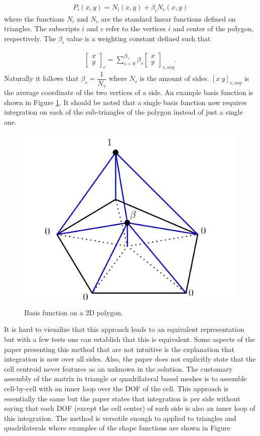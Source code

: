 \documentclass[11pt,letterpaper,titlepage]{article}
\newcommand{\beqn}{\begin{equation}
	\begin{aligned}}
\newcommand{\eeqn}{\end{aligned}
	\end{equation}}
\begin{document}
\beqn 
P_i(x,y) = N_i(x,y) + \beta_i N_c(x,y)
\eeqn 
\newline
where the functions $N_i$ and $N_c$ are the standard linear functions defined on triangles. The subscripts $i$ and $c$ refer to the vertices $i$ and center of the polygon, respectively. The $\beta_i$ value is a weighting constant defined such that 

\beqn 
\begin{bmatrix}
x \\ y
\end{bmatrix}_{c}
= \sum_{s=0}^{N_{s}} \beta_s 
\begin{bmatrix}
x \\ y
\end{bmatrix}_{s,avg}.
\eeqn
\newline
Naturally it follows that $\beta_s = \dfrac{1}{N_{s}}$ where $N_s$ is the amount of sides. $[x \ y]_{s,avg}$ is the average coordinate of the two vertices of a side. An example basis function is shown in Figure \ref{fig:twodpolygon}. It should be noted that a single basis function now requires integration on each of the sub-triangles of the polygon instead of just a single one.

\begin{figure}[H]
\centering
\includegraphics[width=0.5\linewidth]{Figures/TwoD_Polygon}
\caption{Basis function on a 2D polygon.}
\label{fig:twodpolygon}
\end{figure}


It is hard to visualize that this approach leads to an equivalent representation but with a few tests one can establish that this is equivalent. Some aspects of the paper presenting this method \cite{BaileyAdamsPWLPolygons} that are not intuitive is the explanation that integration is now over all sides. Also, the paper does not explicitly state that the cell centroid never features as an unknown in the solution. The customary assembly of the matrix in triangle or quadrilateral based meshes is to assemble cell-by-cell with an inner loop over the DOF of the cell. This approach is essentially the same but the paper states that integration is per side without saying that each DOF (except the cell center) of each side is also an inner loop of this integration. 
\newline
\newline
The method is versatile enough to applied to triangles and quadrilaterals where examples of the shape functions are shown in Figure
\end{document}
